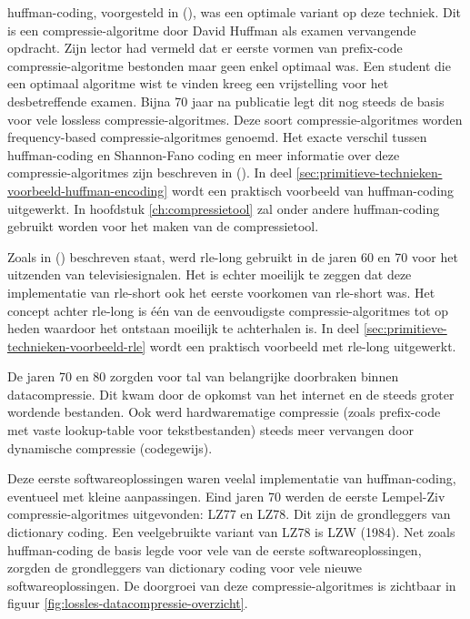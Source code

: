 \Gls{huffman-coding}, voorgesteld in   (\cite{huffman}), was een optimale variant op deze techniek. Dit is een \gls{compressie-algoritme} door David Huffman als examen vervangende opdracht. Zijn lector had vermeld dat er eerste vormen van \gls{prefix-code} \gls{compressie-algoritme} bestonden maar geen enkel optimaal was. Een student die een optimaal algoritme wist te vinden kreeg een vrijstelling voor het desbetreffende examen. Bijna 70 jaar na publicatie legt dit nog steeds de basis voor vele \gls{lossless} \glspl{compressie-algoritme}. Deze soort \glspl{compressie-algoritme} worden frequency-based \glspl{compressie-algoritme} genoemd. Het exacte verschil tussen \gls{huffman-coding} en Shannon-Fano coding en meer informatie over deze \glspl{compressie-algoritme} zijn beschreven in  (\cite{lelewer87datacompression}). In deel \ref{sec:primitieve-technieken-voorbeeld-huffman-encoding} wordt een praktisch voorbeeld van \gls{huffman-coding} uitgewerkt. In hoofdstuk  \ref{ch:compressietool} zal onder andere \gls{huffman-coding} gebruikt worden voor het maken van de compressietool.

Zoals in  (\cite{robinson1967}) beschreven staat, werd \gls{rle-long} gebruikt in de jaren 60 en 70 voor het uitzenden van televisiesignalen. Het is echter moeilijk te zeggen dat deze implementatie van \gls{rle-short} ook het eerste voorkomen van \gls{rle-short} was. Het concept achter \gls{rle-long} is één van de eenvoudigste \glspl{compressie-algoritme} tot op heden waardoor het ontstaan moeilijk te achterhalen is. In deel \ref{sec:primitieve-technieken-voorbeeld-rle} wordt een praktisch voorbeeld met \gls{rle-long} uitgewerkt.

De jaren 70 en 80 zorgden voor tal van belangrijke doorbraken binnen \gls{datacompressie}. Dit kwam door de opkomst van het internet en de steeds groter wordende bestanden. Ook werd hardwarematige compressie (zoals \gls{prefix-code} met vaste \gls{lookup-table} voor tekstbestanden) steeds meer vervangen door dynamische compressie (codegewijs). 

Deze eerste softwareoplossingen waren veelal implementatie van \gls{huffman-coding}, eventueel met kleine aanpassingen. Eind jaren 70 werden de eerste Lempel-Ziv \glspl{compressie-algoritme} uitgevonden: LZ77 en LZ78. Dit zijn de grondleggers van dictionary coding. Een veelgebruikte variant van LZ78 is LZW (1984). Net zoals \gls{huffman-coding} de basis legde voor vele van de eerste softwareoplossingen, zorgden de grondleggers van dictionary coding voor vele nieuwe softwareoplossingen. De doorgroei van deze \glspl{compressie-algoritme} is zichtbaar in figuur \ref{fig:lossles-datacompressie-overzicht}.

